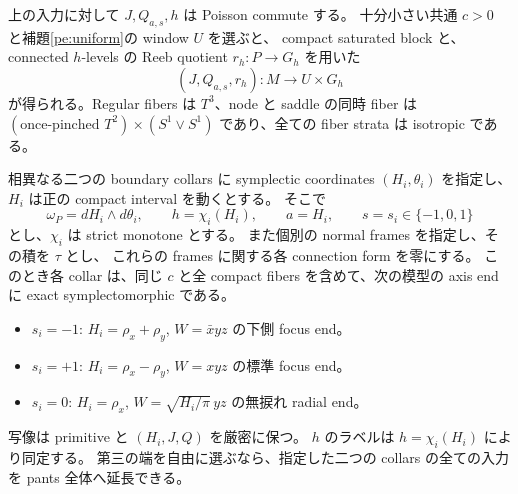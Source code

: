 \begin{theorem}[二端相対構成]\label{pe:two-end}
上の入力に対して $J,Q_{a,s},h$ は Poisson commute する。
十分小さい共通 $c>0$ と補題\ref{pe:uniform}の window $U$ を選ぶと、
compact saturated block と、connected $h$-levels の Reeb quotient $r_h:P\to G_h$ を用いた
\[
 (J,Q_{a,s},r_h):M\longrightarrow U\times G_h
\]
が得られる。Regular fibers は $T^3$、node と saddle の同時 fiber は
$(\text{once-pinched }T^2)\times(S^1\vee S^1)$ であり、全ての fiber strata は isotropic である。

相異なる二つの boundary collars に symplectic coordinates
$(H_i,\theta_i)$ を指定し、$H_i$ は正の compact interval を動くとする。
そこで
\[
 \omega_P=dH_i\wedge d\theta_i,\qquad
 h=\chi_i(H_i),\qquad a=H_i,\qquad s=s_i\in\{-1,0,1\}
\]
とし、$\chi_i$ は strict monotone とする。
また個別の normal frames を指定し、その積を $\tau$ とし、
これらの frames に関する各 connection form を零にする。
このとき各 collar は、同じ $c$ と全 compact fibers を含めて、次の模型の axis end に
exact symplectomorphic である。
\begin{itemize}
 \item $s_i=-1$: $H_i=\rho_x+\rho_y$, $W=\bar x yz$ の下側 focus end。
 \item $s_i=+1$: $H_i=\rho_x-\rho_y$, $W=xyz$ の標準 focus end。
 \item $s_i=0$: $H_i=\rho_x$, $W=\sqrt{H_i/\pi}\,yz$ の無捩れ radial end。
\end{itemize}
写像は primitive と $(H_i,J,Q)$ を厳密に保つ。
$h$ のラベルは $h=\chi_i(H_i)$ により同定する。
第三の端を自由に選ぶなら、指定した二つの collars の全ての入力を pants 全体へ延長できる。
\end{theorem}


